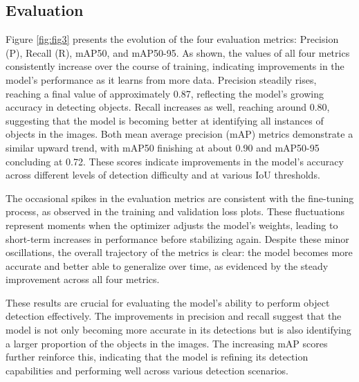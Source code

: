 \documentclass[conference]{IEEEtran}
\begin{document}
\subsection{Evaluation}

Figure \ref{fig:fig3} presents the evolution of the four evaluation metrics: 
Precision (P), 
Recall (R), 
mAP50, 
and mAP50-95. 
As shown, 
the values of all four metrics consistently increase over the course of training, 
indicating improvements in the model’s performance as it learns from more data. 
Precision steadily rises, 
reaching a final value of approximately 0.87, 
reflecting the model's growing accuracy in detecting objects. 
Recall increases as well, 
reaching around 0.80, 
suggesting that the model is becoming better at identifying all instances of objects in the images. 
Both mean average precision (mAP)
metrics demonstrate a similar upward trend, 
with mAP50 finishing at about 0.90 and mAP50-95 concluding at 0.72. 
These scores indicate improvements in the model's accuracy across different levels of detection difficulty and at various IoU thresholds.

The occasional spikes in the evaluation metrics are consistent with the fine-tuning process, 
as observed in the training and validation loss plots. 
These fluctuations represent moments when the optimizer adjusts the model’s weights, 
leading to short-term increases in performance before stabilizing again. 
Despite these minor oscillations, 
the overall trajectory of the metrics is clear: 
the model becomes more accurate and better able to generalize over time, 
as evidenced by the steady improvement across all four metrics.

These results are crucial for evaluating the model’s ability to perform object detection effectively. 
The improvements in precision and recall suggest that the model is not only becoming more accurate in its detections but is also identifying a larger proportion of the objects in the images. 
The increasing mAP scores further reinforce this, 
indicating that the model is refining its detection capabilities and performing well across various detection scenarios.
\end{document}
